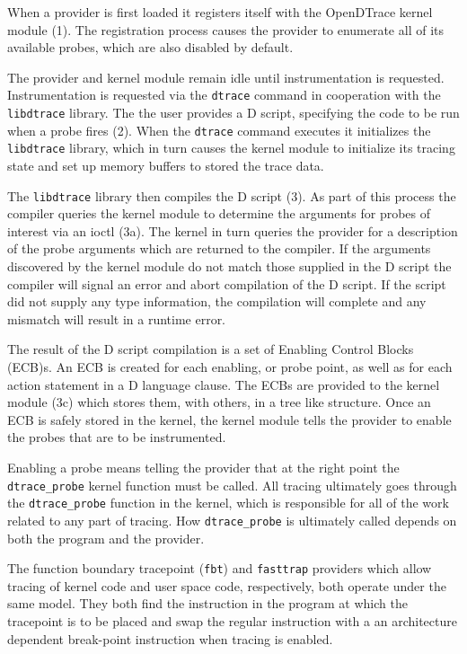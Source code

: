 When a provider is first loaded it registers itself with the
OpenDTrace kernel module (1). The registration process causes the
provider to enumerate all of its available probes, which are also
disabled by default.

The provider and kernel module remain idle until instrumentation is
requested. Instrumentation is requested via the \texttt{dtrace}
command in cooperation with the \texttt{libdtrace} library.  The the
user provides a D script, specifying the code to be run when a probe
fires (2). When the \texttt{dtrace} command executes it initializes
the \texttt{libdtrace} library, which in turn causes the kernel module
to initialize its tracing state and set up memory buffers to stored
the trace data.

The \texttt{libdtrace} library then compiles the D script (3). As part
of this process the compiler queries the kernel module to determine
the arguments for probes of interest via an ioctl (3a). The kernel in
turn queries the provider for a description of the probe arguments
which are returned to the compiler.  If the arguments discovered by
the kernel module do not match those supplied in the D script the
compiler will signal an error and abort compilation of the D script.
If the script did not supply any type information, the compilation
will complete and any mismatch will result in a runtime error.

The result of the D script compilation is a set of Enabling Control Blocks
(ECB)s.  An ECB is created for each enabling, or probe point, as well
as for each action statement in a D language clause.
The ECBs are provided to the kernel module (3c) which stores them,
with others, in a tree like structure. Once an ECB is safely stored in
the kernel, the kernel module tells the provider to enable the probes
that are to be instrumented.

Enabling a probe means telling the provider that at the right point
the \verb|dtrace_probe| kernel function must be called.  All tracing
ultimately goes through the \verb|dtrace_probe| function in the
kernel, which is responsible for all of the work related to any part
of tracing.  How \verb|dtrace_probe| is ultimately called depends on
both the program and the provider.

The function boundary tracepoint (\verb|fbt|) and \verb|fasttrap|
providers which allow tracing of kernel code and user space code,
respectively, both operate under the same model.  They both find the
instruction in the program at which the tracepoint is to be placed and
swap the regular instruction with a an architecture dependent
break-point instruction when tracing is enabled.

